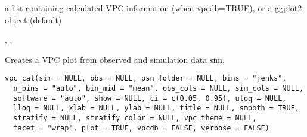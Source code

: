 \documentclass[letterpaper]{book}
\begin{document}
%
\begin{Value}
a list containing calculated VPC information (when vpcdb=TRUE), or a ggplot2 object (default)
\end{Value}
%
\begin{SeeAlso}\relax
{}, , 
\end{SeeAlso}
%
\begin{Description}\relax
Creates a VPC plot from observed and simulation data
sim,
\end{Description}
%
\begin{Usage}
\begin{verbatim}
vpc_cat(sim = NULL, obs = NULL, psn_folder = NULL, bins = "jenks",
  n_bins = "auto", bin_mid = "mean", obs_cols = NULL, sim_cols = NULL,
  software = "auto", show = NULL, ci = c(0.05, 0.95), uloq = NULL,
  lloq = NULL, xlab = NULL, ylab = NULL, title = NULL, smooth = TRUE,
  stratify = NULL, stratify_color = NULL, vpc_theme = NULL,
  facet = "wrap", plot = TRUE, vpcdb = FALSE, verbose = FALSE)
\end{verbatim}
\end{Usage}
%
\end{document}

